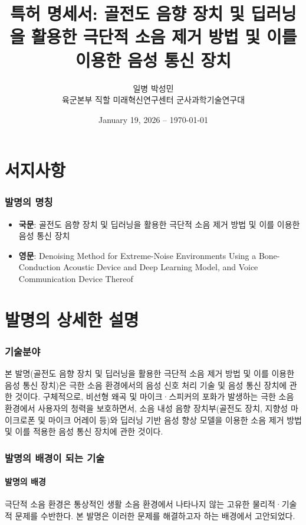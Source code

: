 \documentclass{article}
\title{특허 명세서: 골전도 음향 장치 및 딥러닝을 활용한 극단적 소음 제거 방법 및 이를 이용한 음성 통신 장치}
\author{일병 박성민 \\ 육군본부 직할 미래혁신연구센터 군사과학기술연구대}
\date{January 19, 2026 -- \today}
\begin{document}
\maketitle
\tableofcontents





\newpage
\part{서지사항}
\section{발명의 명칭}
\begin{itemize}
    \item \textbf{국문}: 골전도 음향 장치 및 딥러닝을 활용한 극단적 소음 제거 방법 및 이를 이용한 음성 통신 장치
    \item \textbf{영문}: Denoising Method for Extreme-Noise Environments Using a Bone-Conduction Acoustic Device and Deep Learning Model, and Voice Communication Device Thereof
\end{itemize}






\part{발명의 상세한 설명}


\section{기술분야}

본 발명(골전도 음향 장치 및 딥러닝을 활용한 극단적 소음 제거 방법 및 이를 이용한 음성 통신 장치)은 극한 소음 환경에서의 음성 신호 처리 기술 및 음성 통신 장치에 관한 것이다.
구체적으로, 비선형 왜곡 및 마이크·스피커의 포화가 발생하는 극한 소음 환경에서 사용자의 청력을 보호하면서, 소음 내성 음향 장치부(골전도 장치, 지향성 마이크로폰 및 마이크 어레이 등)와 딥러닝 기반 음성 향상 모델을 이용한 소음 제거 방법 및 이를 적용한 음성 통신 장치에 관한 것이다.

\section{발명의 배경이 되는 기술}

\subsection{발명의 배경} 
극단적 소음 환경은 통상적인 생활 소음 환경에서 나타나지 않는 고유한 물리적·기술적 문제를 수반한다.
본 발명은 이러한 문제를 해결하고자 하는 배경에서 고안되었다.
\end{document}
